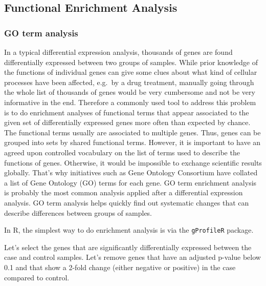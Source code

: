 \documentclass[12pt,]{krantz}
\begin{document}
\hypertarget{functional-enrichment-analysis}{%
\subsection{Functional Enrichment Analysis}\label{functional-enrichment-analysis}}

\hypertarget{go-term-analysis}{%
\subsubsection{GO term analysis}\label{go-term-analysis}}

In a typical differential expression analysis, thousands of genes are found differentially expressed between two groups of samples. While prior knowledge of the functions of individual genes can give some clues about what kind of cellular processes have been affected, e.g.~by a drug treatment, manually going through the whole list of thousands of genes would be very cumbersome and not be very informative in the end. Therefore a commonly used tool to address this problem is to do enrichment analyses of functional terms that appear associated to the given set of differentially expressed genes more often than expected by chance. The functional terms usually are associated to multiple genes. Thus, genes can be grouped into sets by shared functional terms. However, it is important to have an agreed upon controlled vocabulary on the list of terms used to describe the functions of genes. Otherwise, it would be impossible to exchange scientific results globally. That's why initiatives such as Gene Ontology Consortium have collated a list of Gene Ontology (GO) terms for each gene. GO term enrichment analysis is probably the most common analysis applied after a differential expression analysis. GO term analysis helps quickly find out systematic changes that can describe differences between groups of samples.

In R, the simplest way to do enrichment analysis is via the \texttt{gProfileR} package.

Let's select the genes that are significantly differentially expressed between the case and control samples.
Let's remove genes that have an adjusted p-value below 0.1 and that show a 2-fold change (either negative or positive) in the case compared to control.
\end{document}
